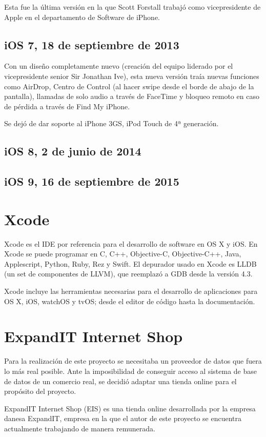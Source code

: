Esta fue la última versión en la que Scott Forstall trabajó como vicepresidente de Apple en el departamento de Software de iPhone.

\subsection{iOS 7, 18 de septiembre de 2013}
Con un diseño completamente nuevo (creación del equipo liderado por el vicepresidente senior Sir Jonathan Ive), esta nueva versión traía nuevas funciones como AirDrop, Centro de Control (al hacer swipe desde el borde de abajo de la pantalla), llamadas de solo audio a través de FaceTime y bloqueo remoto en caso de pérdida a través de Find My iPhone.

Se dejó de dar soporte al iPhone 3GS, iPod Touch de 4ª generación.

\subsection{iOS 8, 2 de junio de 2014}

\subsection{iOS 9, 16 de septiembre de 2015}

\section{Xcode}
Xcode es el IDE por referencia para el desarrollo de software en OS X y iOS. En Xcode se puede programar en C, C++, Objective-C, Objective-C++, Java, Applescript, Python, Ruby, Rez y Swift. El depurador usado en Xcode es LLDB (un set de componentes de LLVM), que reemplazó a GDB desde la versión 4.3.

Xcode incluye las herramientas necesarias para el desarrollo de aplicaciones para OS X, iOS, watchOS y tvOS; desde el editor de código hasta la documentación.

\section{ExpandIT Internet Shop}
Para la realización de este proyecto se necesitaba un proveedor de datos que fuera lo más real posible. Ante la imposibilidad de conseguir acceso al sistema de base de datos de un comercio real, se decidió adaptar una tienda online para el propósito del proyecto.

ExpandIT Internet Shop \cite{EIS} (EIS) es una tienda online desarrollada por la empresa danesa ExpandIT, empresa en la que el autor de este proyecto se encuentra actualmente trabajando de manera remunerada.

